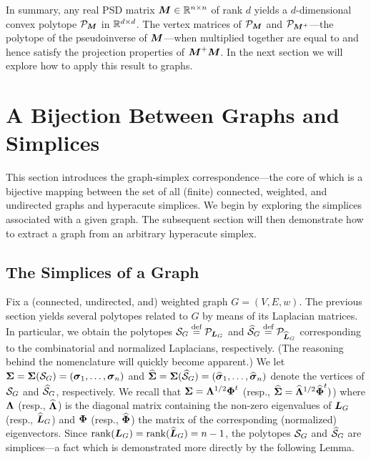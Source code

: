 In summary, any real PSD matrix ${\vb*{M}}\in\mathbb{R}^{n\times n}$ of rank $d$ yields a $d$-dimensional convex polytope $\mathcal{P}_{\vb*{M}}$ in $\mathbb{R}^{d\times d}$.  The vertex matrices of $\mathcal{P}_{\vb*{M}}$ and $\mathcal{P}_{{\vb*{M}}^+}$---the polytope of the pseudoinverse of ${\vb*{M}}$---when multiplied together are equal to and hence satisfy the projection properties of ${\vb*{M}}^+{\vb*{M}}$. In the next section we will explore how to apply this result to graphs. 


\section{A Bijection Between Graphs and Simplices}
\label{sec:bijection_graphs_simplices}
This section introduces the graph-simplex correspondence---the core of which is a bijective mapping between the set of all (finite) connected, weighted, and undirected graphs and hyperacute simplices. 
We begin by exploring the simplices associated with a given graph. The subsequent section will then demonstrate how to extract a graph from an arbitrary hyperacute simplex. 

\subsection{The Simplices of a Graph}
\label{sec:graph_to_simplex}
Fix a (connected, undirected, and) weighted graph $G=(V,E,w)$. The previous section yields several polytopes  related to $G$ by  means of its Laplacian matrices.  In particular, we  obtain  the polytopes $\mathcal{S}_G\overset{\text{def}}{=} \mathcal{P}_{\vb*{L}_G}$ and $\widehat{\mathcal{S}}_G\overset{\text{def}}{=} \mathcal{P}_{\widehat{\vb*{L}}_G}$ corresponding to the combinatorial and normalized Laplacians, respectively.  (The reasoning behind the nomenclature will quickly become apparent.)
We let $\boldsymbol{\Sigma}=\boldsymbol{\Sigma}(\mathcal{S}_G)=(\vb*{\sigma}_1,\dots,\vb*{\sigma}_n)$ and $\widehat{\boldsymbol{\Sigma}}=\boldsymbol{\Sigma}(\widehat{\mathcal{S}}_G)=(\widehat{\vb*{\sigma}}_1,\dots,\widehat{\vb*{\sigma}}_n)$ denote the vertices of $\mathcal{S}_G$ and $\widehat{\mathcal{S}}_G$, respectively. 
We recall that $\boldsymbol{\Sigma}=\vb{\Lambda}^{1/2}\boldsymbol{\Phi}^t$ (resp., $\widehat{\boldsymbol{\Sigma}}=\widehat{\vb{\Lambda}}^{1/2}\widehat{\boldsymbol{\Phi}}^t)$) where $\vb{\Lambda}$ (resp., $\widehat{\vb{\Lambda}}$) is the diagonal matrix containing the non-zero eigenvalues of $\vb*{L}_G$ (resp., $\widehat{\vb*{L}}_G$) and $\boldsymbol{\Phi}$ (resp., $\widehat{\boldsymbol{\Phi}}$) the matrix of the corresponding (normalized) eigenvectors. 
Since $\rank(\vb*{L}_G)=\rank(\widehat{\vb*{L}}_G)=n-1$, the polytopes $\mathcal{S}_G$ and $\widehat{\mathcal{S}}_G$ are simplices---a fact which is demonstrated more directly by the following Lemma.  

